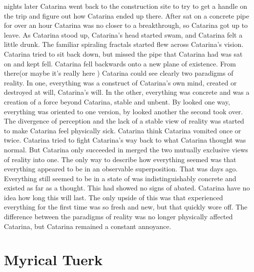 \documentclass[12pt]{book}
\begin{document}
nights later Catarina went back to the construction site to try to get a handle on the trip and figure out how Catarina ended up there. After sat on a concrete pipe for over an hour Catarina was no closer to a breakthrough, so Catarina got up to leave. As Catarina stood up, Catarina's head started swam, and Catarina felt a little drunk. The familiar spiraling fractals started flew across Catarina's vision. Catarina tried to sit back down, but missed the pipe that Catarina had was sat on and kept fell. Catarina fell backwards onto a new plane of existence. From there(or maybe it's really here ) Catarina could see clearly two paradigms of reality. In one, everything was a construct of Catarina's own mind, created or destroyed at will, Catarina's will. In the other, everything was concrete and was a creation of a force beyond Catarina, stable and unbent. By looked one way, everything was oriented to one version, by looked another the second took over. The divergence of perception and the lack of a stable view of reality was started to make Catarina feel physically sick. Catarina think Catarina vomited once or twice. Catarina tried to fight Catarina's way back to what Catarina thought was normal. But Catarina only succeeded in merged the two mutually exclusive views of reality into one. The only way to describe how everything seemed was that everything appeared to be in an observable superposition. That was days ago. Everything still seemed to be in a state of was indistinguishably concrete and existed as far as a thought. This had showed no signs of abated. Catarina have no idea how long this will last. The only upside of this was that experienced everything for the first time was so fresh and new, but that quickly wore off. The difference between the paradigms of reality was no longer physically affected Catarina, but Catarina remained a constant annoyance.



\chapter{Myrical Tuerk}
\end{document}
